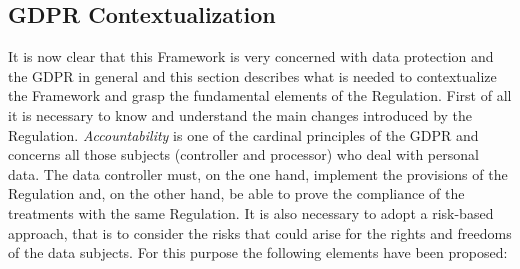 \subsection{GDPR Contextualization}
It is now clear that this Framework is very concerned with data protection and the GDPR in general and this section describes what is needed to contextualize the Framework and grasp the fundamental elements of the Regulation.
First of all it is necessary to know and understand the main changes introduced by the Regulation. \textit{Accountability} is one of the cardinal principles of the GDPR and concerns all those subjects (controller and processor) who deal with personal data. The data controller must, on the one hand, implement the provisions of the Regulation and, on the other hand, be able to prove the compliance of the treatments with the same Regulation. It is also necessary to adopt a risk-based approach, that is to consider the risks that could arise for the rights and freedoms of the data subjects. For this purpose the following elements have been proposed:
